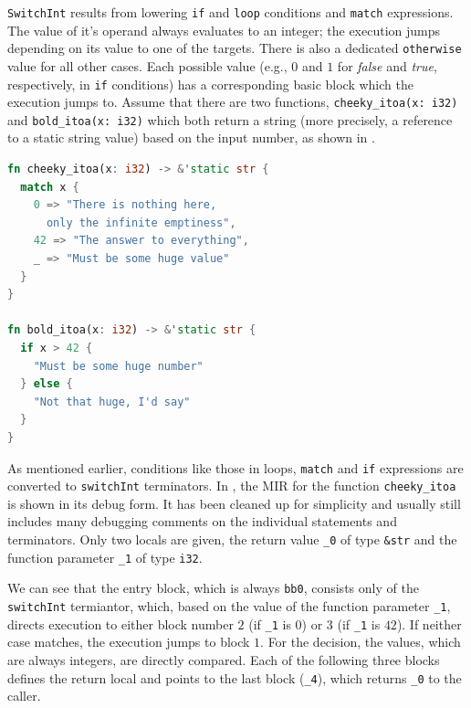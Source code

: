 \documentclass[paper=a4,%
  twoside,%
  BCOR4mm,%
  abstract=true,%
  toc=bibliography,%
  chapterprefix=true,%
  toc=bibliographynumbered,%
  open=right,%
  english,%
  pagesize=pdftex]{scrreprt}
\begin{document}
\lstinline{SwitchInt} results from lowering \lstinline{if} and \lstinline{loop} conditions and \lstinline{match} expressions. The value of it's operand always evaluates to an integer; the execution jumps depending on its value to one of the targets. There is also a dedicated \lstinline{otherwise} value for all other cases. Each possible value (e.g., $0$ and $1$ for \textit{false} and \textit{true}, respectively, in \lstinline{if} conditions) has a corresponding basic block which the execution jumps to. Assume that there are two functions, \lstinline{cheeky_itoa(x: i32)} and \lstinline{bold_itoa(x: i32)} which both return a string (more precisely, a reference to a static string value) based on the input number, as shown in .

\begin{lstlisting}[language=Rust, style=boxed, caption={HIR of the code in \Cref{lst:hir-lowering}}, label=lst:mir-lowering]
fn cheeky_itoa(x: i32) -> &'static str {
  match x {
    0 => "There is nothing here, 
      only the infinite emptiness",
    42 => "The answer to everything",
    _ => "Must be some huge value"
  }
}

fn bold_itoa(x: i32) -> &'static str {
  if x > 42 {
    "Must be some huge number"
  } else {
    "Not that huge, I'd say"
  }
}
\end{lstlisting}

As mentioned earlier, conditions like those in loops, \lstinline{match} and \lstinline{if} expressions are converted to \lstinline{switchInt} terminators. In , the \ac{MIR} for the function \lstinline{cheeky_itoa} is shown in its debug form. It has been cleaned up for simplicity and usually still includes many debugging comments on the individual statements and terminators. Only two locals are given, the return value \lstinline{_0} of type \lstinline{&str} 
and the function parameter \lstinline{_1} of type \lstinline{i32}.

We can see that the entry block, which is always \lstinline{bb0}, consists only of the \lstinline{switchInt} termiantor, which, based on the value of the function parameter \lstinline{_1}, directs execution to either block number $2$ (if \lstinline{_1} is $0$) or $3$ (if \lstinline{_1} is $42$). If neither case matches, the execution jumps to block $1$. For the decision, the values, which are always integers, are directly compared. Each of the following three blocks defines the return local and points to the last block (\lstinline{_4}), which returns \lstinline{_0} to the caller. 
\end{document}
